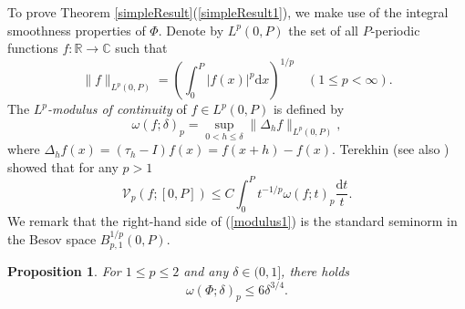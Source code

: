 \documentclass{amsart}
\newtheorem{prop}[theorem]{Proposition}
\numberwithin{equation}{section}
\begin{document}
To prove Theorem \ref{simpleResult}(\ref{simpleResult1}), we make use of the integral smoothness properties of $\Phi$. 
Denote by $L^p(0,P)$ the set of all $P$-periodic functions $f:\mathbb{R}\rightarrow\mathbb{C}$ such that
\begin{equation}
    \nonumber
    \|f\|_{L^p(0,P)}=\left(\int_0^P|f(x)|^p\mathrm{d}x\right)^{1/p}\quad (1\le p<\infty).
\end{equation}
The \emph{$L^p$-modulus of continuity} of $f\in L^p(0,P)$ is defined by
\begin{equation}
    \nonumber
    \omega(f;\delta)_p=\sup_{0<h\le\delta}\|\Delta_hf\|_{L^p(0,P)},
\end{equation}
where $\Delta_hf(x)=(\tau_h-I)f(x)=f(x+h)-f(x)$. Terekhin \cite{Te67} (see also \cite{KoLi09}) showed that for any $p>1$
\begin{equation}
    \label{modulus1}
    \mathcal{V}_p(f;[0,P])\le C\int_0^Pt^{-1/p}\omega(f;t)_p\frac{\mathrm{d}t}{t}.
\end{equation}
We remark that the right-hand side of (\ref{modulus1}) is the standard seminorm in the Besov space $B_{p,1}^{1/p}(0,P)$.
\begin{prop}
    \label{modulusLp}
    For $1\le p\le2$ and any $\delta\in(0,1]$, there holds
    \begin{equation}
        \label{modulusIneq}
        \omega(\Phi;\delta)_p\le 6\delta^{3/4}.
    \end{equation}
\end{prop}
\end{document}
